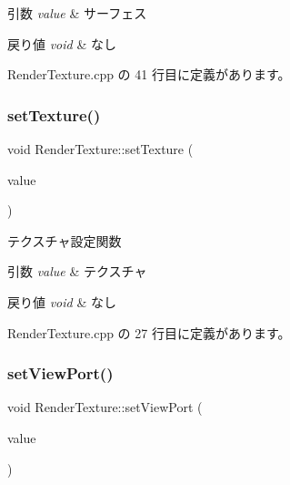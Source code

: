 \begin{DoxyParams}{引数}
{\em value} & サーフェス \\
\hline
\end{DoxyParams}

\begin{DoxyRetVals}{戻り値}
{\em void} & なし \\
\hline
\end{DoxyRetVals}


 Render\+Texture.\+cpp の 41 行目に定義があります。

\mbox{\label{class_render_texture_a219709740e8a3ce6f28f457e28c54fab}} 
\subsubsection{\texorpdfstring{set\+Texture()}{setTexture()}}
{\footnotesize\ttfamily void Render\+Texture\+::set\+Texture (\begin{DoxyParamCaption}\item[{L\+P\+D\+I\+R\+E\+C\+T3\+D\+T\+E\+X\+T\+U\+R\+E9}]{value }\end{DoxyParamCaption})}



テクスチャ設定関数 


\begin{DoxyParams}{引数}
{\em value} & テクスチャ \\
\hline
\end{DoxyParams}

\begin{DoxyRetVals}{戻り値}
{\em void} & なし \\
\hline
\end{DoxyRetVals}


 Render\+Texture.\+cpp の 27 行目に定義があります。

\mbox{\label{class_render_texture_aef70e6af97e99bed0f8fc535aa6bce77}} 
\subsubsection{\texorpdfstring{set\+View\+Port()}{setViewPort()}}
{\footnotesize\ttfamily void Render\+Texture\+::set\+View\+Port (\begin{DoxyParamCaption}\item[{D3\+D\+V\+I\+E\+W\+P\+O\+R\+T9}]{value }\end{DoxyParamCaption})}



